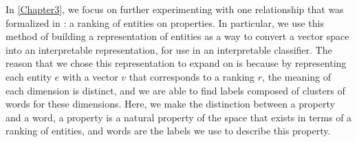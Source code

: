 In \ref{Chapter3}, we focus on further experimenting with one relationship that was formalized in \cite{Derrac2015}: a ranking of entities on properties. In particular, we use this method of building a representation of entities as a way to convert a vector space into an interpretable representation, for use in an interpretable classifier. The reason that we chose this representation to expand on is because by representing each entity $e$ with a vector $v$ that corresponds to a ranking $r$, the meaning of each dimension is distinct, and we are able to find labels composed of clusters of words for these dimensions. Here, we make the distinction between a property and a word, a property is a natural property of the space that exists in terms of a ranking of entities, and words are the labels we use to describe this property.